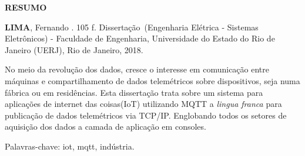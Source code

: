 \begin{center}
\textbf{RESUMO}
\end{center}

%
%

$\!$\\

\hspace{-1.3cm}\textbf{LIMA}, Fernando \textit{\setTitulo}. 105 f. Dissertação~(Engenharia Elétrica - Sistemas Eletrônicos) - Faculdade de Engenharia, Universidade do Estado do Rio de Janeiro (UERJ), Rio de Janeiro, 2018.

\vspace{.2cm}

No meio da revolução dos dados, cresce o interesse em comunicação entre máquinas e compartilhamento de dados telemétricos sobre dispositivos, seja numa fábrica ou em residências. Esta dissertação trata sobre um sistema para aplicações de internet das coisas(IoT) utilizando MQTT a \textit{lingua franca} para publicação de dados telemétricos via TCP/IP. Englobando todos os setores de aquisição dos dados a camada de aplicação em consoles.

\vspace{1cm}

\hspace{-1.3cm}Palavras-chave: iot, mqtt, indústria.